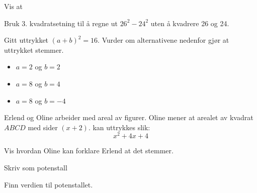 \newpage
{}
Vis at

Bruk 3. kvadratsetning til å regne ut $ 26^2-24^2 $ uten å kvadrere 26 og 24.


Gitt uttrykket $ {(a+b)^2=16} $.
Vurder om alternativene nedenfor gjør at uttrykket stemmer.
\begin{itemize}
	\item $ a=2 $ og $ b=2 $
	\item $ a=8 $ og $ b=4 $
	\item $ a=8 $ og $ b=-4 $
\end{itemize}

\newpage
{}
Erlend og Oline arbeider med areal av figurer.
Oline mener at arealet av kvadrat $ ABCD $ med sider $ (x + 2) $.
kan uttrykkes slik:
\[ x^2 + 4x + 4 \]

Vis hvordan Oline kan forklare Erlend at det stemmer.


\nes

Skriv som potenstall \os
{} \vsk


Finn verdien til potenstallet.\os
{} 


